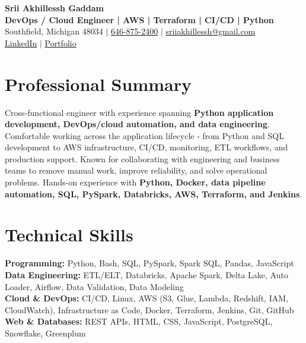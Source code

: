 \documentclass[letterpaper,10pt]{article}
\begin{document}
\fontsize{9.35pt}{10.45pt}\selectfont

\begin{center}
    {\LARGE \textbf{Srii Akhillessh Gaddam}} \\[-1pt]
    \textbf{DevOps / Cloud Engineer | AWS | Terraform | CI/CD | Python} \\[2pt]
    Southfield, Michigan 48034 $|$
    \href{tel:6468752400}{646-875-2400} $|$
    \href{mailto:sriiakhillessh@gmail.com}{sriiakhillessh@gmail.com} \\[1pt]
    \href{https://www.linkedin.com/in/srii-akhiilessh-gaddam-b48668191/}{LinkedIn} $|$
    \href{https://sriiakhillesshg.github.io/portfolio/}{Portfolio}
\end{center}
\vspace{-8pt}

\section{Professional Summary}
\small{Cross-functional engineer with experience spanning \textbf{Python application development, DevOps/cloud automation, and data engineering}. Comfortable working across the application lifecycle - from Python and SQL development to AWS infrastructure, CI/CD, monitoring, ETL workflows, and production support. Known for collaborating with engineering and business teams to remove manual work, improve reliability, and solve operational problems. Hands-on experience with \textbf{Python, Docker, data pipeline automation, SQL, PySpark, Databricks, AWS, Terraform, and Jenkins}.}

\section{Technical Skills}
\small{
\textbf{Programming:} Python, Bash, SQL, PySpark, Spark SQL, Pandas, JavaScript \\
\textbf{Data Engineering:} ETL/ELT, Databricks, Apache Spark, Delta Lake, Auto Loader, Airflow, Data Validation, Data Modeling \\
\textbf{Cloud \& DevOps:} CI/CD, Linux, AWS (S3, Glue, Lambda, Redshift, IAM, CloudWatch), Infrastructure as Code, Docker, Terraform, Jenkins, Git, GitHub \\
\textbf{Web \& Databases:} REST APIs, HTML, CSS, JavaScript, PostgreSQL, Snowflake, Greenplum
}
\end{document}
